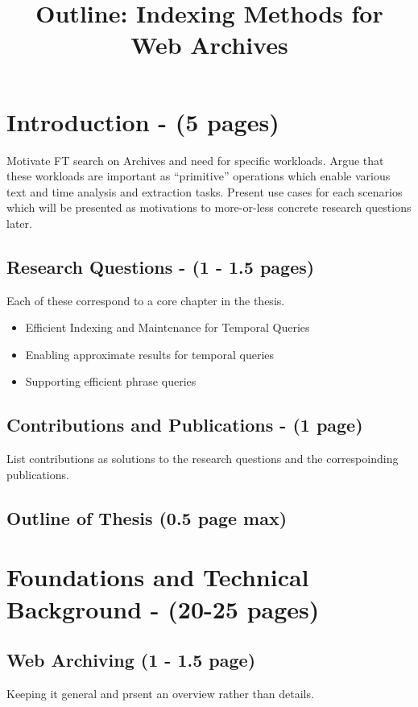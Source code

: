 \documentclass[12pt]{article}
\begin{document}
\title{Outline: Indexing Methods for Web Archives}
\maketitle

\section{Introduction - (5 pages)}
	Motivate FT search on Archives and need for specific workloads. Argue that these workloads are important as ``primitive'' operations which enable various text and time analysis and extraction tasks. Present use cases for each scenarios which will be presented as motivations to more-or-less concrete research questions later.

	\subsection{Research Questions - (1 - 1.5 pages)}
	Each of these correspond to a core chapter in the thesis.
		\begin{itemize}
			\item{Efficient Indexing and Maintenance for Temporal Queries}
			\item{Enabling approximate results for temporal queries}
			\item{Supporting efficient phrase queries}
		\end{itemize}
	\subsection{Contributions and Publications - (1 page)}
		List contributions as solutions to the research questions and the correspoinding publications.
	\subsection{Outline of Thesis (0.5 page max)} 

\newpage
\section{Foundations and Technical Background - (20-25 pages)}
	
	\subsection{Web Archiving (1 - 1.5 page)} 
		Keeping it general and prsent an overview rather than details.
	
\end{document}
